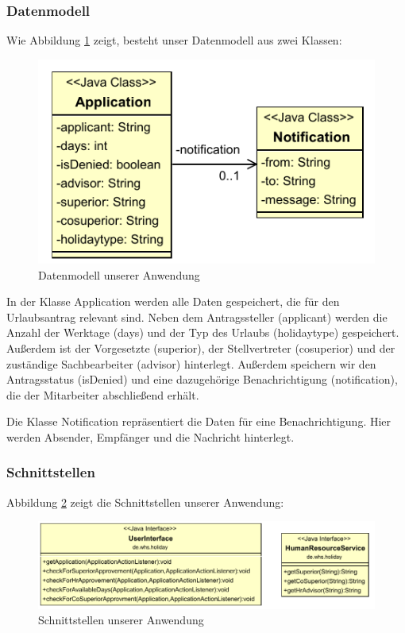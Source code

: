 \subsubsection{Datenmodell}
Wie Abbildung \ref{fig:Datenmodell} zeigt, besteht unser Datenmodell aus zwei Klassen:

\begin{figure}[H]
\centering
\includegraphics[width=0.5\linewidth]{Bilder/Datenmodell}
\caption{Datenmodell unserer Anwendung}
\label{fig:Datenmodell}
\end{figure}

In der Klasse Application werden alle Daten gespeichert, die für den Urlaubsantrag relevant sind. Neben dem Antragssteller (applicant) werden die Anzahl der Werktage (days) und der Typ des Urlaubs (holidaytype) gespeichert. Außerdem ist der Vorgesetzte (superior), der Stellvertreter (cosuperior) und der zuständige Sachbearbeiter (advisor) hinterlegt. Außerdem speichern wir den Antragsstatus (isDenied) und eine dazugehörige Benachrichtigung (notification), die der Mitarbeiter abschließend erhält.

Die Klasse Notification repräsentiert die Daten für eine Benachrichtigung. Hier werden Absender, Empfänger und die Nachricht hinterlegt. 

\subsubsection{Schnittstellen}
Abbildung \ref{fig:Schnittstellen} zeigt die Schnittstellen unserer Anwendung:

\begin{figure}[H]
\centering
\includegraphics[width=1.0\linewidth]{Bilder/Schnittstellen}
\caption{Schnittstellen unserer Anwendung}
\label{fig:Schnittstellen}
\end{figure}

